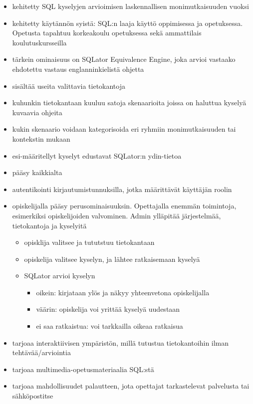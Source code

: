 \begin{itemize}
    \item kehitetty SQL kyselyjen arvioimisen laskennallisen monimutkaisuuden vuoksi
    \item kehitetty käytännön syistä: SQL:n laaja käyttö oppimisessa ja opetuksessa. Opetusta tapahtuu korkeakoulu opetuksessa sekä ammattilais koulutuskursseilla
    \item tärkein ominaisuus on SQLator Equivalence Engine, joka arvioi vastaako ehdotettu vastaus englanninkielistä ohjetta
    \item sisältää useita valittavia tietokantoja
    \item kuhunkin tietokantaan kuuluu satoja skenaarioita joissa on haluttua kyselyä kuvaavia ohjeita
    \item kukin skenaario voidaan kategorisoida eri ryhmiin monimutkaisuuden tai kontekstin mukaan
    \item esi-määritellyt kyselyt edustavat SQLator:n ydin-tietoa
    \item pääsy kaikkialta
    \item autentikointi kirjautumistunnuksilla, jotka määrittävät käyttäjän roolin
    \item opiskelijalla pääsy perusominaisuuksin. Opettajalla enemmän toimintoja, esimerkiksi opiskelijoiden valvominen. Admin ylläpitää järjestelmää, tietokantoja ja kyselyitä
    \begin{itemize}
        \item opisklija valitsee ja tututstuu tietokantaan
        \item opiskelija valitsee kyselyn, ja lähtee ratkaisemaan kyselyä
        \item SQLator arvioi kyselyn
        \begin{itemize}
            \item oikein: kirjataan ylös ja näkyy yhteenvetona opiskelijalla
            \item väärin: opiskelija voi yrittää kyselyä uudestaan
            \item ei saa ratkaistua: voi tarkkailla oikeaa ratkaisua
        \end{itemize}
    \end{itemize}
    \item tarjoaa interaktiivisen ympäristön, millä tutustua tietokantoihin ilman tehtävää/arviointia
    \item tarjoaa multimedia-opetusmateriaalia SQL:stä
    \item tarjoaa mahdollisuudet palautteen, jota opettajat tarkastelevat palvelusta tai sähköpostitse

\end{itemize}
